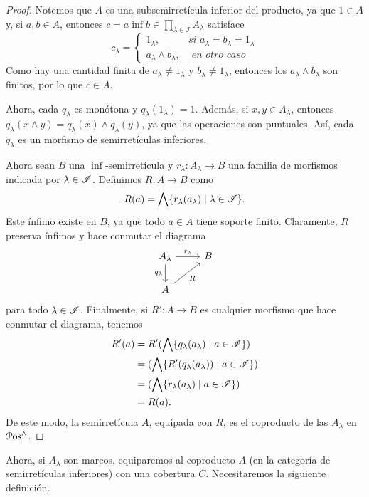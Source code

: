 \begin{proof}
    Notemos que $A$ es una subsemirretícula inferior del producto,
    ya que $1\in A$ y, si $a,b\in A$, entonces
    $c=a\inf b\in \prod_{\lambda\in\mathscr I} A_\lambda$
    satisface
    \[c_\lambda=
    \begin{cases}
        1_\lambda, & \textit{si }a_\lambda=b_\lambda=1_\lambda\\
        a_\lambda\wedge b_\lambda, & \textit{ en otro caso}
    \end{cases}
    \]
    Como hay una cantidad finita de
    $a_\lambda\neq 1_\lambda$ y $b_\lambda\neq 1_\lambda$,
    entonces los $a_\lambda\wedge b_\lambda$ son finitos,
    por lo que $c\in A$.
    
    Ahora, cada $q_\lambda$ es monótona y $q_\lambda(1_\lambda)=1$.
    Además, si $x,y\in A_\lambda$, entonces
    $q_\lambda(x\wedge y)=q_\lambda(x)\wedge q_\lambda(y)$,
    ya que las operaciones son puntuales.
    Así, cada $q_\lambda$ es un morfismo de semirretículas
    inferiores.
    
    Ahora sean $B$ una $\inf$-semirretícula y
    $r_\lambda:A_\lambda\to B$ una familia de morfismos
    indicada por $\lambda\in\mathscr{I}$.
    Definimos $R:A\to B$ como
    \[
        R(a) = \bigwedge\{r_\lambda(a_\lambda) \mid \lambda \in \mathscr{I}\}
    .\]
    Este ínfimo existe en $B$, ya que todo $a\in A$ tiene soporte
    finito.
    Claramente, $R$ preserva ínfimos y hace conmutar el diagrama
    \[
        \begin{tikzcd}
            A_\lambda \ar[r,"r_\lambda"] \ar[d,"q_\lambda"']
            & B \\
            A \ar[ur,"R"']
        \end{tikzcd}
    \]
    para todo $\lambda\in \mathscr{I}$.
    Finalmente, si $R':A\to B$ es cualquier morfismo
    que hace conmutar el diagrama, tenemos
    \begin{align*}
        R'(a)
        &= R'(\bigwedge\{q_\lambda(a_\lambda)\mid a\in \mathscr{I}\}) \\
        &= (\bigwedge\{R'(q_\lambda(a_\lambda))\mid a\in \mathscr{I}\}) \\
        &= (\bigwedge\{r_\lambda(a_\lambda)\mid a\in \mathscr{I}\}) \\
        &= R(a).
    \end{align*}
    De este modo, la semirretícula $A$, equipada con $R$,
    es el coproducto de las $A_\lambda$ en $\mathcal{P}\mathrm{os}^{\wedge}$.
\end{proof}

Ahora, si $A_\lambda$ son marcos, equiparemos al coproducto $A$ (en la
categoría de semirretículas inferiores) con una cobertura $C$.
Necesitaremos la siguiente definición.

